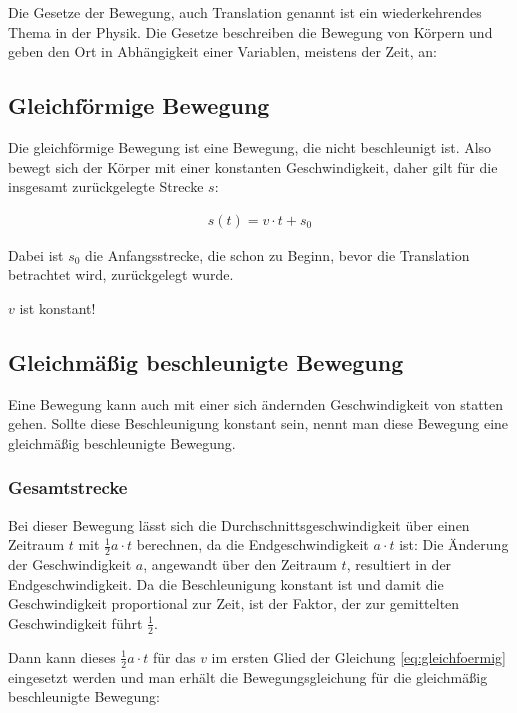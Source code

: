 Die Gesetze der Bewegung, auch Translation genannt ist ein wiederkehrendes Thema in der Physik. Die Gesetze beschreiben die Bewegung von Körpern und geben den Ort in Abhängigkeit einer Variablen, meistens der Zeit, an:

\subsection{Gleichförmige Bewegung}

Die gleichförmige Bewegung ist eine Bewegung, die nicht beschleunigt ist. Also bewegt sich der Körper mit einer konstanten Geschwindigkeit, daher gilt für die insgesamt zurückgelegte Strecke $s$:

\begin{align} \label{eq:gleichfoermig}
	s(t) = v \cdot t + s_0
\end{align}

\noindent Dabei ist $s_0$ die Anfangsstrecke, die schon zu Beginn, bevor die Translation betrachtet wird, zurückgelegt wurde.

\begin{Wichtig}
$v$ ist konstant!
\end{Wichtig}

\subsection{Gleichmäßig beschleunigte Bewegung}
Eine Bewegung kann auch mit einer sich ändernden Geschwindigkeit von statten gehen. Sollte diese Beschleunigung konstant sein, nennt man diese Bewegung eine gleichmäßig beschleunigte Bewegung.

\subsubsection{Gesamtstrecke}

Bei dieser Bewegung lässt sich die Durchschnittsgeschwindigkeit über einen Zeitraum $t$ mit $\frac{1}{2}a \cdot t$ berechnen, da die Endgeschwindigkeit $a \cdot t$ ist: Die Änderung der Geschwindigkeit $a$, angewandt über den Zeitraum $t$, resultiert in der Endgeschwindigkeit. Da die Beschleunigung konstant ist und damit die Geschwindigkeit proportional zur Zeit, ist der Faktor, der zur gemittelten Geschwindigkeit führt $\frac{1}{2}$.

Dann kann dieses $\frac{1}{2}a \cdot t$ für das $v$ im ersten Glied der Gleichung \ref{eq:gleichfoermig} eingesetzt werden und man erhält die Bewegungsgleichung für die gleichmäßig beschleunigte Bewegung:


